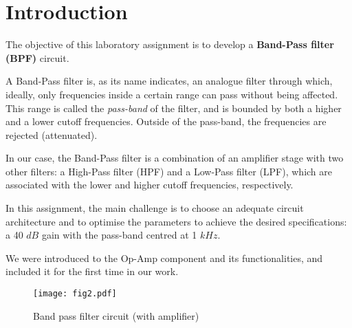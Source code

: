 \section{Introduction}
\label{sec:introduction}


\indent

The objective of this laboratory assignment is to develop a \textbf{Band-Pass filter (BPF)} circuit.

A Band-Pass filter is, as its name indicates, an analogue filter through which, ideally, only frequencies inside a certain range can pass without being affected. This range is called the \textit{pass-band} of the filter, and is bounded by both a higher and a lower cutoff frequencies. Outside of the pass-band, the frequencies are rejected (attenuated). 

In our case, the Band-Pass filter is a combination of an amplifier stage with two other filters: a High-Pass filter (HPF) and a Low-Pass filter (LPF), which are associated with the lower and higher cutoff frequencies, respectively. 

In this assignment, the main challenge is to choose an adequate circuit architecture and to optimise the parameters to achieve the desired specifications: a 40 $dB$ gain with the pass-band centred at 1 $kHz$.  

We were introduced to the Op-Amp component and its functionalities, and included it for the first time in our work. 



\begin{figure}[h!]
    \centering
    \texttt{[image: fig2.pdf]}
    \caption{Band pass filter circuit (with amplifier)}
    \label{fig:schematic}
\end{figure}
